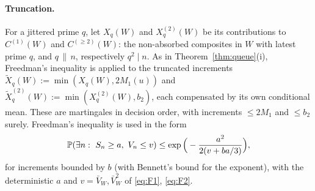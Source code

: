 \paragraph{Truncation.} For a jittered prime $q$, let $X_q(W)$ and $X^{(2)}_q(W)$ be its contributions to $C^{(1)}(W)$ and
$C^{(\ge2)}(W)$: the non-absorbed composites in $W$ with latest prime $q$, and $q\,\|\,n$, respectively $q^2\mid n$. As in
Theorem~\ref{thm:queue}(i), Freedman's inequality is applied to the truncated increments
$\tilde X_q(W):=\min(X_q(W),2M_1(u))$ and $\tilde X^{(2)}_q(W):=\min(X^{(2)}_q(W),b_2)$, each compensated by its own
conditional mean. These are martingales in decision order, with increments $\le2M_1$ and $\le b_2$ surely. Freedman's
inequality is used in the form
\[
  \mathbb{P}(\exists n:\ S_n\ge a,\ V_n\le v)\le\exp\Big(-\frac{a^2}{2(v+ba/3)}\Big),
\]
for increments bounded by $b$ \cite[(4.1)]{Freedman1975} (with Bennett's bound for the exponent), with the deterministic $a$
and $v=\bar V_W,\bar V^2_W$ of \eqref{eq:F1}, \eqref{eq:F2}.
